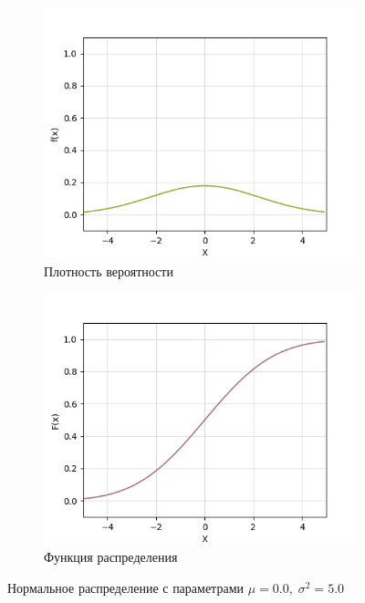 \begin{figure}[H]
	\begin{subfigure}{.5\textwidth}
		\centering
		\includegraphics[width=.8\linewidth]{assets/normpdf00-50.png}
		\caption{Плотность вероятности}
		\label{fig:normpdf00-50}
	\end{subfigure}%
	\begin{subfigure}{.5\textwidth}
		\centering
		\includegraphics[width=.8\linewidth]{assets/normcdf00-50.png}
		\caption{Функция распределения}
		\label{fig:normcdf00-50}
	\end{subfigure}
	\caption{Нормальное распределение с параметрами $\mu = 0.0, \; \sigma^2 = 5.0$}
	\label{fig:norm00-50}
\end{figure}

